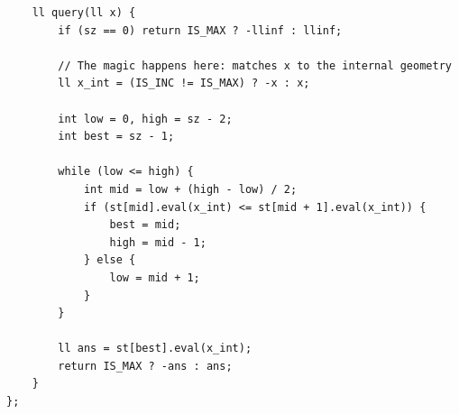 \documentclass[9pt,a4paper,twocolumn]{extarticle}
\begin{document}
\begin{lstlisting}
    ll query(ll x) {
        if (sz == 0) return IS_MAX ? -llinf : llinf;

        // The magic happens here: matches x to the internal geometry
        ll x_int = (IS_INC != IS_MAX) ? -x : x;
        
        int low = 0, high = sz - 2;
        int best = sz - 1;
        
        while (low <= high) {
            int mid = low + (high - low) / 2;
            if (st[mid].eval(x_int) <= st[mid + 1].eval(x_int)) {
                best = mid;
                high = mid - 1; 
            } else {
                low = mid + 1;  
            }
        }
        
        ll ans = st[best].eval(x_int);
        return IS_MAX ? -ans : ans;
    }
};
\end{lstlisting}

\filbreak
\end{document}
